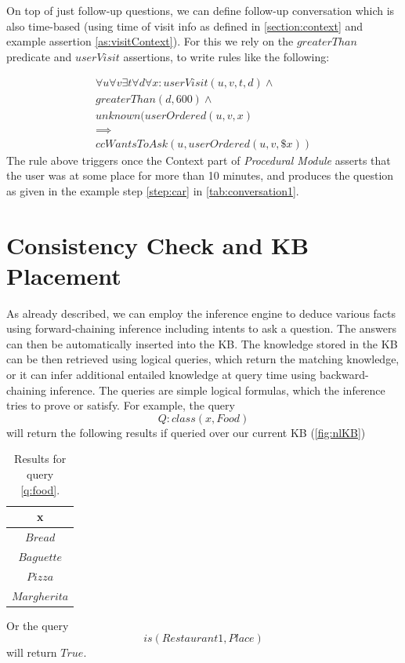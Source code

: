 On top of just follow-up questions, we can define follow-up conversation which
is also time-based (using time of visit info as defined in 
\autoref{section:context} and example assertion \ref{as:visitContext}). For
this we rely on the $greaterThan$ predicate and $userVisit$ assertions, to
write rules like the following:

\begin{equation}\label{rule:whatOrdered}
\begin{gathered}
\forall u\forall v \exists t\forall d\forall x: userVisit(u,v,t,d) \land\\
    greaterThan(d,600)\land \\
    unknown(userOrdered(u,v,x) \\
    \implies \\
    ccWantsToAsk(u, userOrdered(u,v,\$x))
\end{gathered}
\end{equation}
The rule above triggers once the Context part of \emph{Procedural Module}
asserts that the user was at some place for more than 10 minutes, and
produces the question as given in the example step \ref{step:car} in 
\autoref{tab:conversation1}.

\section{Consistency Check and KB Placement}
\label{section:consistency}
As already described, we can employ the inference engine to deduce various 
facts using forward-chaining inference including intents to ask a question. 
The answers can then be automatically inserted into the KB. The knowledge 
stored in the KB can be then retrieved using logical queries, which return 
the matching knowledge, or it can infer additional entailed knowledge at 
query time using backward-chaining inference. The queries are simple logical 
formulas, which the inference tries to prove or satisfy. For example, the
query
\begin{equation}\label{q:food}
	Q:class(x,Food)
\end{equation}
will return the following results if queried over our current KB 
(\autoref{fig:nlKB})

\begin{table}[H]
\centering
\caption{Results for query \ref{q:food}.}
\label{tab:nlResultsFood}
\begin{tabular}{|c|}
	\hline
	\textbf{x} \\
    \hline
    $Bread$ \\
    \hline
    $Baguette$ \\
    \hline 
	$Pizza$ \\
	\hline
	$Margherita$ \\
	\hline
\end{tabular}
\end{table}
Or the query
\begin{equation}
is(Restaurant1,Place)
\end{equation}
will return $True$.

